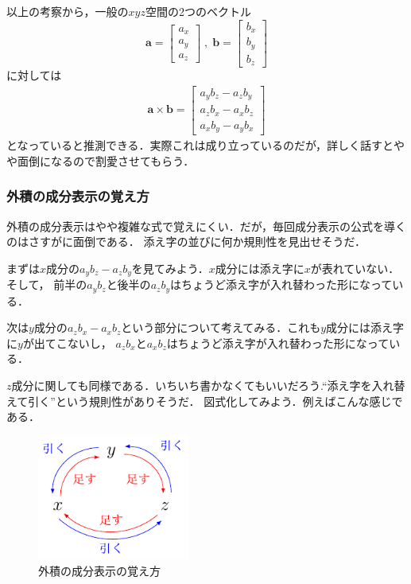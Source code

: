 以上の考察から，一般の$xyz$空間の2つのベクトル
$$
\bm{a} = \left[
 \begin{array}{c}
  a_x \\ 
  a_y \\
  a_z
 \end{array}
\right]
\; , \; 
\bm{b} = \left[
 \begin{array}{c}
  b_x \\ 
  b_y \\
  b_z
 \end{array}
\right]
$$
に対しては
\begin{align}
\bm{a} \times \bm{b} = \left[
 \begin{array}{c}
a_y b_z - a_z b_y \\
a_z b_x - a_x b_z \\
a_x b_y - a_y b_x
\end{array}
\right]
\label{eq:gaisekiseibun}
\end{align}
となっていると推測できる．実際これは成り立っているのだが，詳しく話すとやや面倒になるので割愛させてもらう．

\subsubsection{外積の成分表示の覚え方}
外積の成分表示はやや複雑な式で覚えにくい．だが，毎回成分表示の公式を導くのはさすがに面倒である．
添え字の並びに何か規則性を見出せそうだ．

まずは$x$成分の$a_y b_z - a_z b_y$を見てみよう．$x$成分には添え字に$x$が表れていない．そして，
前半の$a_y b_z$と後半の$a_z b_y$はちょうど添え字が入れ替わった形になっている．

次は$y$成分の$a_z b_x - a_x b_z$という部分について考えてみる．これも$y$成分には添え字に$y$が出てこないし，
$a_z b_x$と$a_x b_z$はちょうど添え字が入れ替わった形になっている．

$z$成分に関しても同様である．いちいち書かなくてもいいだろう.``添え字を入れ替えて引く''という規則性がありそうだ．
図式化してみよう．例えばこんな感じである．
\begin{figure}[h]
 \centering
 \includegraphics[width=5cm]{picture/vecter4.pdf}
 \caption{外積の成分表示の覚え方}
\end{figure}

